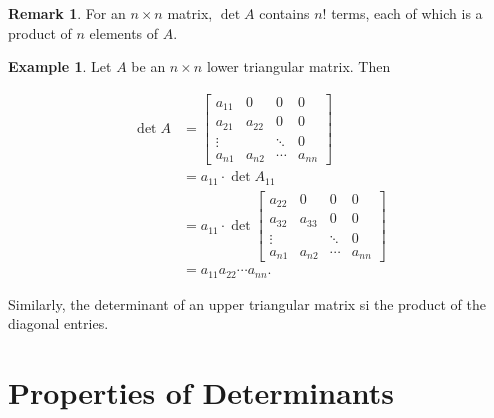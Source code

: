 \documentclass[12pt]{article}
\theoremstyle{definition}
\newtheorem*{example}{Example}
\newtheorem*{remark}{Remark}
\begin{document}
\begin{remark}
For an $n \times n$ matrix, $\det A$ contains $n!$ terms, each of which is a product
of $n$ elements of $A$.
\end{remark}

\begin{example}
Let $A$ be an $n \times n$ lower triangular matrix. Then

\begin{align*}
\det A &= 
\begin{bmatrix}
a_{11} & 0 & 0 & 0 \\
a_{21} & a_{22} & 0 & 0\\
\vdots & & \ddots & 0 \\
a_{n1} & a_{n2} & \cdots & a_{nn}
\end{bmatrix} \\
&= a_{11} \cdot \det A_{11} \\
&= a_{11} \cdot \det
\begin{bmatrix}
a_{22} & 0 & 0 & 0 \\
a_{32} & a_{33} & 0 & 0 \\
\vdots & & \ddots & 0 \\
a_{n1} & a_{n2} & \cdots & a_{nn}
\end{bmatrix} \\
&= a_{11}a_{22} \cdots a_{nn}.
\end{align*}

Similarly, the determinant of an upper triangular matrix si the product of the
diagonal entries.

\end{example}

\section{Properties of Determinants}
\end{document}
